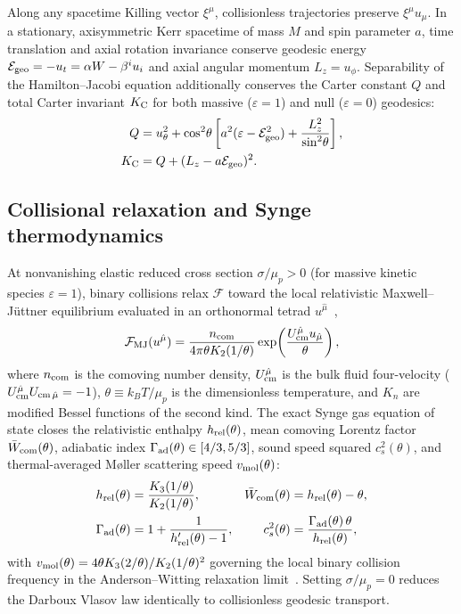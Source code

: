 Along any spacetime Killing vector $\xi^\mu$, collisionless trajectories preserve $\xi^\mu u_\mu$. In a stationary, axisymmetric Kerr spacetime of mass $M$ and spin parameter $a$, time translation and axial rotation invariance conserve geodesic energy $\mathcal{E}_{\rm geo} = -u_t = \alpha W - \beta^i u_i$ and axial angular momentum $L_z = u_\phi$. Separability of the Hamilton--Jacobi equation additionally conserves the Carter constant $Q$ and total Carter invariant $K_{\rm C}$ for both massive ($\varepsilon = 1$) and null ($\varepsilon = 0$) geodesics:
\begin{align}\label{eq:carter_invariants}
Q &= u_\theta^2 + \cos^2\!\theta\left[a^2(\varepsilon - \mathcal{E}_{\rm geo}^2) + \frac{L_z^2}{\sin^2\!\theta}\right], \nonumber\\
K_{\rm C} &= Q + (L_z - a\mathcal{E}_{\rm geo})^2.
\end{align}

\subsection{Collisional relaxation and Synge thermodynamics}\label{sec:system_synge}

At nonvanishing elastic reduced cross section $\sigma/\mu_p > 0$ (for massive kinetic species $\varepsilon = 1$), binary collisions relax $\mathcal{F}$ toward the local relativistic Maxwell--J\"uttner equilibrium evaluated in an orthonormal tetrad $u^{\hat{\mu}}$~\cite{Synge:1957,Israel:1963},
\begin{equation}\label{eq:maxwell_juttner}
\mathcal{F}_{\rm MJ}(u^{\hat{\mu}}) = \frac{n_{\rm com}}{4\pi \theta K_2(1/\theta)} \exp\!\left(\frac{U_{\rm cm}^{\hat{\mu}} u_{\hat{\mu}}}{\theta}\right),
\end{equation}
where $n_{\rm com}$ is the comoving number density, $U_{\rm cm}^{\hat{\mu}}$ is the bulk fluid four-velocity ($U_{\rm cm}^{\hat{\mu}} U_{{\rm cm}\,\hat{\mu}} = -1$), $\theta \equiv k_B T / \mu_p$ is the dimensionless temperature, and $K_n$ are modified Bessel functions of the second kind. The exact Synge gas equation of state closes the relativistic enthalpy $h_{\rm rel}(\theta)$, mean comoving Lorentz factor $\bar{W}_{\rm com}(\theta)$, adiabatic index $\Gamma_{\rm ad}(\theta) \in [4/3, 5/3]$, sound speed squared $c_s^2(\theta)$, and thermal-averaged M\o ller scattering speed $v_{\rm mol}(\theta)$:
\begin{align}\label{eq:synge_eos}
h_{\rm rel}(\theta) &= \frac{K_3(1/\theta)}{K_2(1/\theta)}, &
\bar{W}_{\rm com}(\theta) &= h_{\rm rel}(\theta) - \theta, \nonumber\\
\Gamma_{\rm ad}(\theta) &= 1 + \frac{1}{h'_{\rm rel}(\theta) - 1}, &
c_s^2(\theta) &= \frac{\Gamma_{\rm ad}(\theta)\,\theta}{h_{\rm rel}(\theta)},
\end{align}
with $v_{\rm mol}(\theta) = 4\theta K_3(2/\theta)/K_2(1/\theta)^2$ governing the local binary collision frequency in the Anderson--Witting relaxation limit~\cite{Anderson:1974}. Setting $\sigma/\mu_p = 0$ reduces the Darboux Vlasov law identically to collisionless geodesic transport.

